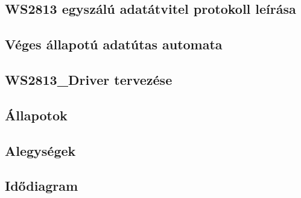 \subsection{WS2813 egyszálú adatátvitel protokoll leírása}


\subsection{Véges állapotú adatútas automata}


\subsection{WS2813\_Driver tervezése}


\subsection{Állapotok}


\subsection{Alegységek}


\subsection{Idődiagram}
